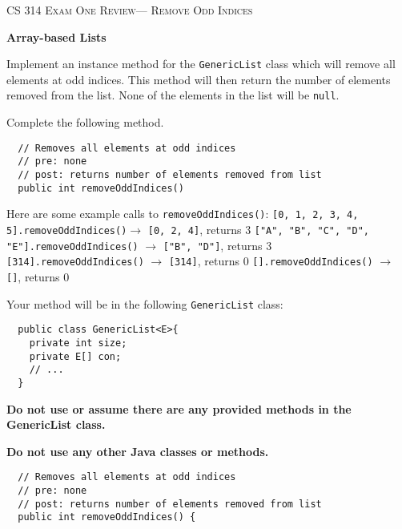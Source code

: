 \documentclass[12pt,letter]{article}
\begin{document}
\noindent\textsc{\large CS 314 Exam One Review--- Remove Odd Indices}

\vspace{6pt}
\noindent\textbf{Array-based Lists}

\vspace{2pt}
\noindent Implement an instance method for the \texttt{GenericList} class which will 
remove all elements at odd indices. This method will then return the number of elements
removed from the list. None of the elements in the list will be \texttt{null}.

\vspace{4pt}
\noindent Complete the following method.
\begin{verbatim}
  // Removes all elements at odd indices
  // pre: none
  // post: returns number of elements removed from list
  public int removeOddIndices()
\end{verbatim}

\vspace{4pt}

\noindent Here are some example calls to \texttt{removeOddIndices()}:
\newline
\noindent \texttt{[0, 1, 2, 3, 4, 5].removeOddIndices()}$ \rightarrow $ \texttt{[0, 2, 4]}, returns 3
\newline
\noindent \texttt{["A", "B", "C", "D", "E"].removeOddIndices()} $ \rightarrow $ \texttt{["B", "D"]}, returns 3
\newline
\noindent \texttt{[314].removeOddIndices()} $\rightarrow$ \texttt{[314]}, returns 0
\newline
\noindent \texttt{[].removeOddIndices()} $\rightarrow$ \texttt{[]}, returns 0
\newline

\noindent Your method will be in the following \texttt{GenericList} class:

\begin{verbatim}
  public class GenericList<E>{
    private int size;
    private E[] con;
    // ...
  }

\end{verbatim}

\noindent \textbf{Do not use or assume there are any provided methods in the GenericList class.}

\noindent \textbf{Do not use any other Java classes or methods.}

\clearpage
\begin{verbatim}
  // Removes all elements at odd indices
  // pre: none
  // post: returns number of elements removed from list
  public int removeOddIndices() {
\end{verbatim}
\end{document}
